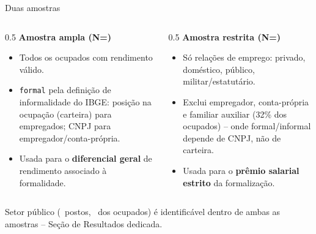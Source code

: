 \documentclass[aspectratio=169]{beamer}
\newcommand{\highlight}[1]{\textcolor{accentblue}{\textbf{#1}}}
\begin{document}
\begin{frame}{Duas amostras}
  \small
  \begin{columns}[T]
    \begin{column}{0.5\linewidth}
      \textbf{Amostra ampla (N=\NAmpla)}
      \begin{itemize}
        \item Todos os ocupados com rendimento v\'alido.
        \item \texttt{formal} pela defini\c{c}\~ao de informalidade do IBGE: posi\c{c}\~ao na ocupa\c{c}\~ao (carteira) para empregados; CNPJ para empregador/conta-pr\'opria.
        \item Usada para o \highlight{diferencial geral} de rendimento associado \`a formalidade.
      \end{itemize}
    \end{column}
    \begin{column}{0.5\linewidth}
      \textbf{Amostra restrita (N=\NRestrita)}
      \begin{itemize}
        \item S\'o rela\c{c}\~oes de emprego: privado, dom\'estico, p\'ublico, militar/estatut\'ario.
        \item Exclui empregador, conta-pr\'opria e familiar auxiliar (32\% dos ocupados) -- onde formal/informal depende de CNPJ, n\~ao de carteira.
        \item Usada para o \highlight{pr\^emio salarial estrito} da formaliza\c{c}\~ao.
      \end{itemize}
    \end{column}
  \end{columns}
  \vspace{3mm}
  {\footnotesize Setor p\'ublico (\NSetorPublico\ postos, \PctSetorPublico\ dos ocupados) \'e identific\'avel dentro de ambas as amostras -- Se\c{c}\~ao de Resultados dedicada.}
\end{frame}
\end{document}
